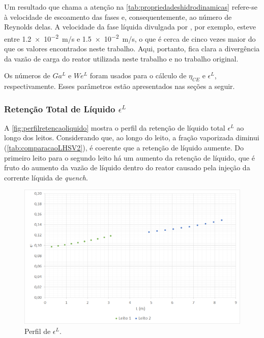 Um resultado que chama a atenção na \autoref{tab:propriedadeshidrodinamicas}
refere-se à velocidade de escoamento das fases e, consequentemente, ao número de
Reynolds delas. A velocidade da fase líquida divulgada por
, por exemplo, esteve entre \SI{1,2e-2}{m/s} e
\SI{1,5e-2}{m/s}, o que é cerca de cinco vezes maior do que os valores
encontrados neste trabalho. Aqui, portanto, fica clara a divergência da vazão de
carga do reator utilizada neste trabalho e no trabalho original.

Os números de $Ga^L$ e $We^L$ foram usados para o cálculo de $\eta_{CE}$ e
$\epsilon^{L}$, respectivamente. Esses parâmetros estão apresentados nas seções
a seguir.

\subsubsection{Retenção Total de Líquido $\epsilon^{L}$}
\label{retencaototaldeliquido}

A \autoref{fig:perfilretencaoliquido} mostra o perfil da retenção de líquido
total $\epsilon^{L}$ ao longo dos leitos. Considerando que, ao longo do leito, a fração vaporizada diminui
(\autoref{tab:comparacaoLHSV2}), é coerente que a retenção de líquido aumente.
Do primeiro leito para o segundo leito há um aumento da retenção de líquido, que
é fruto do aumento da vazão de líquido dentro do reator causado pela injeção da
corrente líquida de \emph{quench}.

\begin{figure}[htb]
\centering
\includegraphics[scale=0.4]{images/Chap4/perfilretencaoliquido.png}
\caption{Perfil de $\epsilon^{L}$.}
\label{fig:perfilretencaoliquido}
\end{figure}

